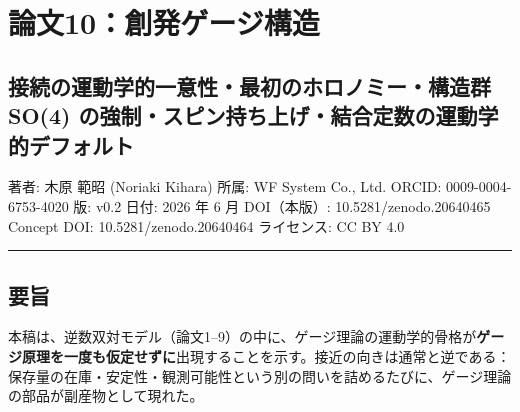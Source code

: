 \documentclass[
]{ltjsarticle}
\author{}
\date{}
\begin{document}
\section{論文10：創発ゲージ構造}\label{ux8ad6ux658710ux5275ux767aux30b2ux30fcux30b8ux69cbux9020}

\subsection{接続の運動学的一意性・最初のホロノミー・構造群 SO(4)
の強制・スピン持ち上げ・結合定数の運動学的デフォルト}\label{ux63a5ux7d9aux306eux904bux52d5ux5b66ux7684ux4e00ux610fux6027ux6700ux521dux306eux30dbux30edux30ceux30dfux30fcux69cbux9020ux7fa4-so4-ux306eux5f37ux5236ux30b9ux30d4ux30f3ux6301ux3061ux4e0aux3052ux7d50ux5408ux5b9aux6570ux306eux904bux52d5ux5b66ux7684ux30c7ux30d5ux30a9ux30ebux30c8}

著者: 木原 範昭 (Noriaki Kihara) 所属: WF System Co., Ltd. ORCID:
0009-0004-6753-4020 版: v0.2 日付: 2026 年 6 月 DOI（本版）: 10.5281/zenodo.20640465
Concept DOI: 10.5281/zenodo.20640464 ライセンス: CC BY 4.0

\begin{center}\rule{0.5\linewidth}{0.5pt}\end{center}

\subsection{要旨}\label{ux8981ux65e8}

本稿は、逆数双対モデル（論文1--9）の中に、ゲージ理論の運動学的骨格が\textbf{ゲージ原理を一度も仮定せずに}出現することを示す。接近の向きは通常と逆である：保存量の在庫・安定性・観測可能性という別の問いを詰めるたびに、ゲージ理論の部品が副産物として現れた。
\end{document}
